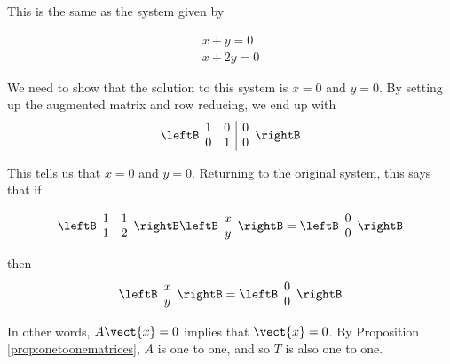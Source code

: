 \begin{solution}
This is the same as the system given by

\begin{equation*}
\begin{array}{c}
x + y = 0 \\
x + 2y = 0
\end{array}
\end{equation*}

We need to show that the solution to this system is $x = 0$ and $y = 0$. By setting up the augmented matrix and row reducing, we end up with
\begin{equation*} \leftB
\begin{array}{rr|r}
1 & 0 & 0 \\
0 & 1 & 0
\end{array}
\rightB
\end{equation*}

This tells us that $x = 0$ and $y = 0$. Returning to the original system, this says that if 

\begin{equation*}
\leftB
\begin{array}{cc}
1 & 1 \\
1 & 2\\
\end{array}
\rightB
\leftB
\begin{array}{c}
x\\
y
\end{array}
\rightB
=
\leftB
\begin{array}{c}
0 \\
0
\end{array}
\rightB
\end{equation*}

then 
\begin{equation*}
\leftB
\begin{array}{c}
x \\
y
\end{array}
\rightB
=
\leftB
\begin{array}{c}
0 \\
0
\end{array}
\rightB
\end{equation*}

In other words, $A\vect{x}=0$ implies that $\vect{x}=0$. By 
Proposition \ref{prop:onetoonematrices}, $A$ is one to one, and so $T$ is also one to one.


\end{solution}
